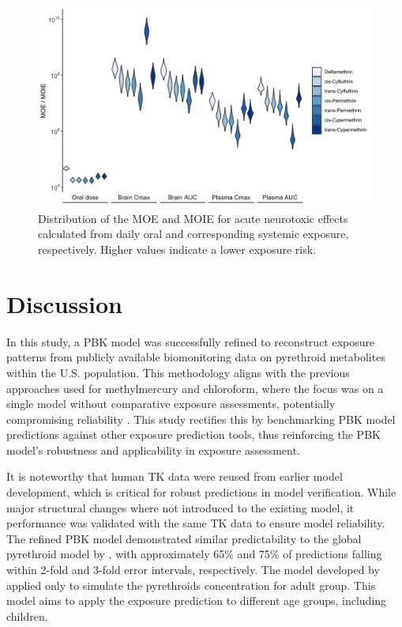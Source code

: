 \documentclass[toxics,article,submit,pdftex,moreauthors]{Definitions/mdpi}
\begin{document}
\begin{figure}[H]
\includegraphics[width=1\linewidth,]{figures/fig8} \caption{Distribution of the MOE and MOIE for acute neurotoxic effects calculated from daily oral and corresponding systemic exposure, respectively. Higher values indicate a lower exposure risk.}\label{fig:fig8}
\end{figure}

\section{Discussion}

In this study, a PBK model was successfully refined to reconstruct
exposure patterns from publicly available biomonitoring data on
pyrethroid metabolites within the U.S. population. This methodology
aligns with the previous approaches used for methylmercury and
chloroform, where the focus was on a single model without comparative
exposure assessments, potentially compromising reliability
\citep{allen2007use, lyons2008computational}. This study rectifies this
by benchmarking PBK model predictions against other exposure prediction
tools, thus reinforcing the PBK model's robustness and applicability in
exposure assessment.

It is noteworthy that human TK data were reused from earlier model development,
which is critical for robust predictions in model verification. While major
structural changes where not introduced to the existing model, it performance
was validated with the same TK data to ensure model reliability. The refined
PBK model demonstrated similar predictability to the global pyrethroid model by
\citet{quindroit2021estimating}, with approximately 65\% and 75\% of
predictions falling within 2-fold and 3-fold error intervals, respectively. The
model developed by \citet{quindroit2021estimating} applied only to simulate the
pyrethroids concentration for adult group. This model aims to apply the
exposure prediction to different age groups, including children.
\end{document}
